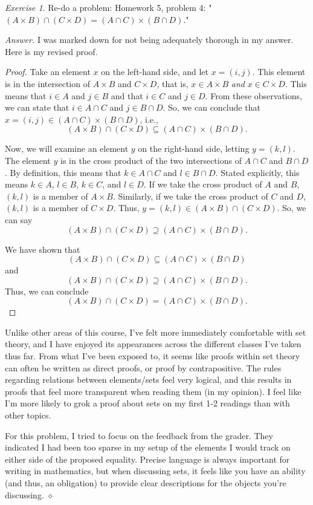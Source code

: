 \documentclass[12pt,oneside]{amsart}
\theoremstyle{remark}
\newtheorem{exer}{Exercise}
\newenvironment{answer}{\bigskip\noindent\emph{Answer.}}{\hfill$\diamond$\newline}
\begin{document}
\newpage
\begin{exer}
Re-do a problem: Homework 5, problem 4: "$(A \times B) \cap (C \times D) = (A \cap C) \times (B \cap D).$"
\end{exer}

\begin{answer}
I was marked down for not being adequately thorough in my answer. Here is my revised proof.
\begin{proof}
Take an element $x$ on the left-hand side, and let $x = (i, j)$. This element is in the intersection of $A \times B$ and $C \times D$, that is, $x \in A \times B$ \emph{and} $x \in C \times D$. This means that $i \in A$ and $j \in B$ and that $i \in C$ and $j \in D$. From these observations, we can state that $i \in A \cap C$ and $j \in B \cap D$. So, we can conclude that $x = (i, j) \in (A \cap C) \times (B \cap D)$, i.e., \[ (A \times B) \cap (C \times D) \subseteq (A \cap C) \times (B \cap D). \]

Now, we will examine an element $y$ on the right-hand side, letting $y = (k, l)$. The element $y$ is in the cross product of the two intersections of $A \cap C$ and $B \cap D$. By definition, this means that $k \in A \cap C$ and $l \in B \cap D$. Stated explicitly, this means $k \in A$, $l \in B$, $k \in C$, and $l \in D$.
If we take the cross product of $A$ and $B$, $(k, l)$ is a member of $A \times B$. Similarly, if we take the cross product of $C$ and $D$, $(k, l)$ is a member of $C \times D$. Thus, $y = (k, l) \in (A \times B) \cap (C \times D)$. So, we can say \[ (A \times B) \cap (C \times D) \supseteq (A \cap C) \times (B \cap D). \]

We have shown that \[ (A \times B) \cap (C \times D) \subseteq (A \cap C) \times (B \cap D) \] and \[ (A \times B) \cap (C \times D) \supseteq (A \cap C) \times (B \cap D). \] Thus, we can conclude \[ (A \times B) \cap (C \times D) = (A \cap C) \times (B \cap D). \]
\end{proof}

Unlike other areas of this course, I've felt more immediately comfortable with set theory, and I have enjoyed its appearances across the different classes I've taken thus far. From what I've been exposed to, it seems like proofs within set theory can often be written as direct proofs, or proof by contrapositive. The rules regarding relations between elements/sets feel very logical, and this results in proofs that feel more transparent when reading them (in my opinion). I feel like I'm more likely to grok a proof about sets on my first 1-2 readings than with other topics.

For this problem, I tried to focus on the feedback from the grader. They indicated I had been too sparse in my setup of the elements I would track on either side of the proposed equality. Precise language is always important for writing in mathematics, but when discussing sets, it feels like you have an ability (and thus, an obligation) to provide clear descriptions for the objects you're discussing.
\end{answer}
\end{document}
